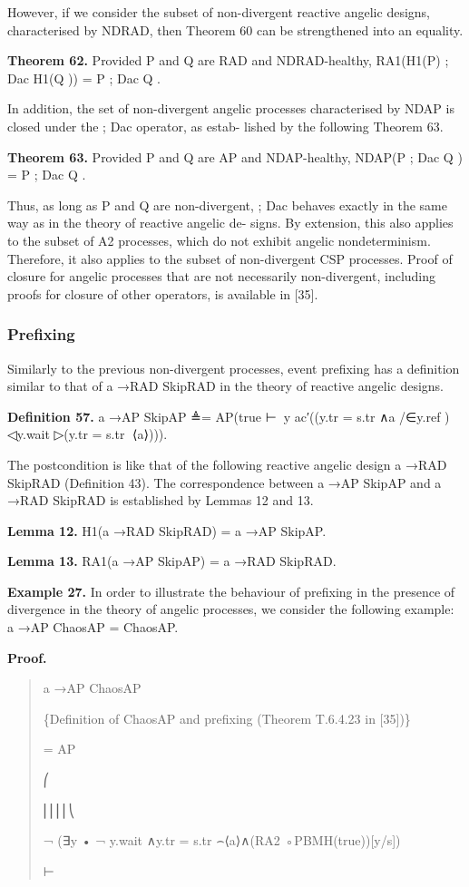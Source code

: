 \documentclass[11pt]{article}
\begin{document}
However, if we consider the subset of non-divergent reactive angelic designs, characterised by NDRAD, then Theorem 60 can be strengthened into an equality.

\noindent\textbf{Theorem 62.} Provided P and Q are RAD and NDRAD-healthy, RA1(H1(P) ; Dac H1(Q )) = P ; Dac Q .


In addition, the set of non-divergent angelic processes characterised by NDAP is closed under the ; Dac operator, as estab- lished by the following Theorem 63.

\noindent\textbf{Theorem 63.} Provided P and Q are AP and NDAP-healthy, NDAP(P ; Dac Q ) = P ; Dac Q .


Thus, as long as P and Q are non-divergent, ; Dac behaves exactly in the same way as in the theory of reactive angelic de- signs. By extension, this also applies to the subset of A2 processes, which do not exhibit angelic nondeterminism. Therefore, it also applies to the subset of non-divergent CSP processes. Proof of closure for angelic processes that are not necessarily non-divergent, including proofs for closure of other operators, is available in [35].

\subsubsection{Prefixing}
Similarly to the previous non-divergent processes, event prefixing has a definition similar to that of a →RAD SkipRAD in the theory of reactive angelic designs.

\noindent\textbf{Definition 57.} a →AP SkipAP ≜= AP(true ⊢∈⃝y ac′((y.tr = s.tr ∧a /∈y.ref ) ◁y.wait ▷(y.tr = s.tr ⌢⟨a⟩))).


The postcondition is like that of the following reactive angelic design a →RAD SkipRAD (Definition 43). The correspondence between a →AP SkipAP and a →RAD SkipRAD is established by Lemmas 12 and 13.

\noindent\textbf{Lemma 12.} H1(a →RAD SkipRAD) = a →AP SkipAP.


\noindent\textbf{Lemma 13.} RA1(a →AP SkipAP) = a →RAD SkipRAD.


\noindent\textbf{Example 27.} In order to illustrate the behaviour of prefixing in the presence of divergence in the theory of angelic processes, we consider the following example: a →AP ChaosAP = ChaosAP.


\noindent\textbf{Proof.}


\begin{quote}\small\raggedright
a →AP ChaosAP
\par
\{Definition of ChaosAP and prefixing (Theorem T.6.4.23 in [35])\}
\par
= AP
\par
⎛
\par
⎜⎜⎜⎜⎝
\par
¬ (∃y • ¬ y.wait ∧y.tr = s.tr ⌢⟨a⟩∧(RA2 ◦PBMH(true))[y/s])
\par
⊢
\end{quote}
\end{document}
